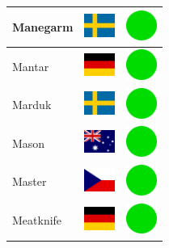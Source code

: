 \documentclass[12pt, a4paper, twoside]{report}
\begin{document}
\begin{center}
\begin{longtable}{|p{5cm}|p{2cm}|p{2cm}|}
Manegarm & \includegraphics[width=1cm]{4x3/se} & \includegraphics[width=1cm]{likes/y} \\ \hline
Mantar & \includegraphics[width=1cm]{4x3/de} & \includegraphics[width=1cm]{likes/y} \\ \hline
Marduk & \includegraphics[width=1cm]{4x3/se} & \includegraphics[width=1cm]{likes/y} \\ \hline
Mason & \includegraphics[width=1cm]{4x3/au} & \includegraphics[width=1cm]{likes/y} \\ \hline
Master & \includegraphics[width=1cm]{4x3/cz} & \includegraphics[width=1cm]{likes/y} \\ \hline
Meatknife & \includegraphics[width=1cm]{4x3/de} & \includegraphics[width=1cm]{likes/y} \\ \hline

\end{longtable}
\end{center}
\end{document}
